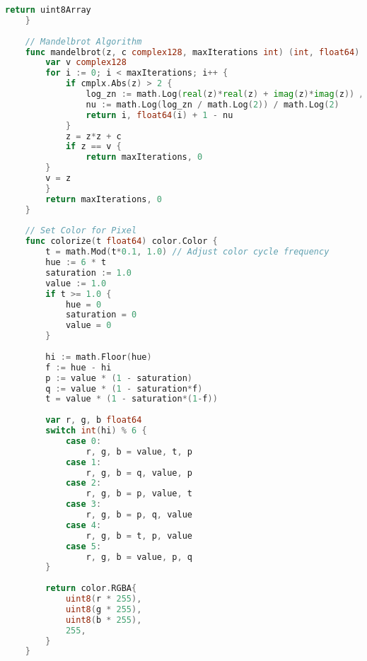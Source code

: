 \begin{lstlisting}[language=go, frame=tb, caption={Mandelbrot Set Calculation (WASM build)}]
        return uint8Array
    }
    
    // Mandelbrot Algorithm
    func mandelbrot(z, c complex128, maxIterations int) (int, float64) {
        var v complex128
        for i := 0; i < maxIterations; i++ {
            if cmplx.Abs(z) > 2 {
                log_zn := math.Log(real(z)*real(z) + imag(z)*imag(z)) / 2
                nu := math.Log(log_zn / math.Log(2)) / math.Log(2)
                return i, float64(i) + 1 - nu
            }
            z = z*z + c
            if z == v {
                return maxIterations, 0
        }
        v = z
        }
        return maxIterations, 0
    }
    
    // Set Color for Pixel
    func colorize(t float64) color.Color {
        t = math.Mod(t*0.1, 1.0) // Adjust color cycle frequency
        hue := 6 * t
        saturation := 1.0
        value := 1.0
        if t >= 1.0 {
            hue = 0
            saturation = 0
            value = 0
        }
    
        hi := math.Floor(hue)
        f := hue - hi
        p := value * (1 - saturation)
        q := value * (1 - saturation*f)
        t = value * (1 - saturation*(1-f))
    
        var r, g, b float64
        switch int(hi) % 6 {
            case 0:
                r, g, b = value, t, p
            case 1:
                r, g, b = q, value, p
            case 2:
                r, g, b = p, value, t
            case 3:
                r, g, b = p, q, value
            case 4:
                r, g, b = t, p, value
            case 5:
                r, g, b = value, p, q
        }
    
        return color.RGBA{
            uint8(r * 255),
            uint8(g * 255),
            uint8(b * 255),
            255,
        }
    }    
\end{lstlisting}


